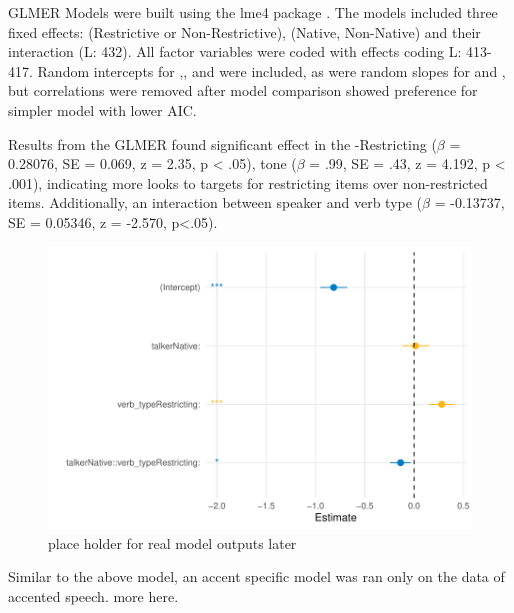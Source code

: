

GLMER Models were built using the lme4 package \parencite{Bates2014-eq}. The models included three fixed effects:  (Restrictive or Non-Restrictive), (Native, Non-Native) and their interaction (L: 432). All factor variables were coded with
effects coding L: 413-417. Random intercepts for ,, and
 were included, as were random slopes for  and , but correlations were removed after model comparison showed preference for simpler model with lower AIC.



Results from the GLMER found significant effect in the -Restricting ($\beta$ = 0.28076, SE = 0.069, z = 2.35, p < .05), tone ($\beta$ = .99, SE = .43, z = 4.192, p < .001), indicating more looks to targets for restricting items over non-restricted items. Additionally, an interaction between speaker and verb type ($\beta$ = -0.13737, SE = 0.05346, z = -2.570, p<.05). 

\begin{figure}[h]
    \centering
    \includegraphics[width=\textwidth]{figures/GLMER_base_model.pdf}
    \caption{place holder for real model outputs later}
    \label{fig:model_outputs}
\end{figure}
 
 Similar to the above model, an accent specific model was ran only on the data of accented speech. more here.
 

